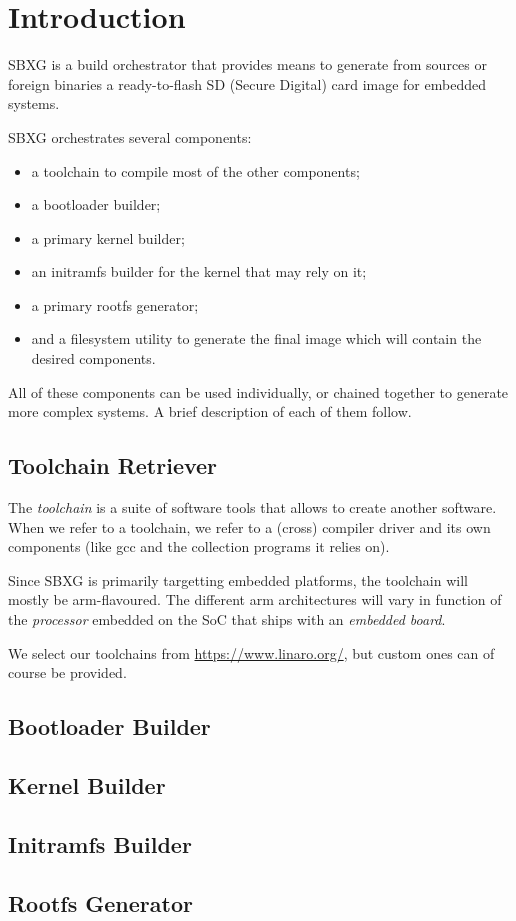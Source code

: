 \documentclass{article}
\begin{document}
\section{Introduction}

SBXG is a build orchestrator that provides means to generate from sources or
foreign binaries a ready-to-flash SD (Secure Digital) card image for embedded systems.

SBXG orchestrates several components:
\begin{itemize}
\item a toolchain to compile most of the other components;
\item a bootloader builder;
\item a primary kernel builder;
\item an initramfs builder for the kernel that may rely on it;
\item a primary rootfs generator;
\item and a filesystem utility to generate the final image which will contain the
  desired components.
\end{itemize}

All of these components can be used individually, or chained together to
generate more complex systems. A brief description of each of them follow.

\subsection{Toolchain Retriever}

The \emph{toolchain} is a suite of software tools that allows to create another
software. When we refer to a toolchain, we refer to a (cross) compiler driver
and its own components (like gcc and the collection programs it relies on).

Since SBXG is primarily targetting embedded platforms, the toolchain will mostly
be arm-flavoured. The different arm architectures will vary in function of the
\emph{processor} embedded on the SoC that ships with an \emph{embedded board}.

We select our toolchains from \url{https://www.linaro.org/}, but custom ones can
of course be provided.


\subsection{Bootloader Builder}
\subsection{Kernel Builder}
\subsection{Initramfs Builder}
\subsection{Rootfs Generator}
\end{document}
